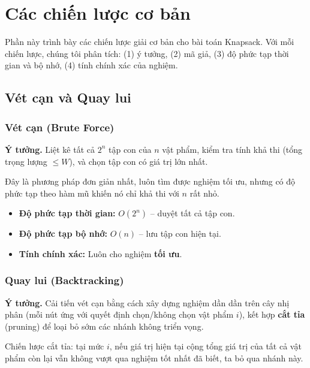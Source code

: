 \documentclass[fontsize=13pt,a4paper]{report}
\begin{document}
\section{Các chiến lược cơ bản}
\label{sec:basic_strategies}

Phần này trình bày các chiến lược giải cơ bản cho bài toán Knapsack. Với mỗi chiến lược, chúng tôi phân tích: (1) ý tưởng, (2) mã giả, (3) độ phức tạp thời gian và bộ nhớ, (4) tính chính xác của nghiệm.


\subsection{Vét cạn và Quay lui}

\subsubsection*{Vét cạn (Brute Force)}

\textbf{Ý tưởng.} Liệt kê tất cả $2^n$ tập con của $n$ vật phẩm, kiểm tra tính khả thi (tổng trọng lượng $\leq W$), và chọn tập con có giá trị lớn nhất.

Đây là phương pháp đơn giản nhất, luôn tìm được nghiệm tối ưu, nhưng có độ phức tạp theo hàm mũ khiến nó chỉ khả thi với $n$ rất nhỏ.

\begin{itemize}[noitemsep]
    \item \textbf{Độ phức tạp thời gian:} $O(2^n)$ -- duyệt tất cả tập con.
    \item \textbf{Độ phức tạp bộ nhớ:} $O(n)$ -- lưu tập con hiện tại.
    \item \textbf{Tính chính xác:} Luôn cho nghiệm \textbf{tối ưu}.
\end{itemize}

\subsubsection*{Quay lui (Backtracking)}

\textbf{Ý tưởng.} Cải tiến vét cạn bằng cách xây dựng nghiệm dần dần trên cây nhị phân (mỗi nút ứng với quyết định chọn/không chọn vật phẩm $i$), kết hợp \textbf{cắt tỉa} (pruning) để loại bỏ sớm các nhánh không triển vọng.

Chiến lược cắt tỉa: tại mức $i$, nếu giá trị hiện tại cộng tổng giá trị của tất cả vật phẩm còn lại vẫn không vượt qua nghiệm tốt nhất đã biết, ta bỏ qua nhánh này.
\end{document}
